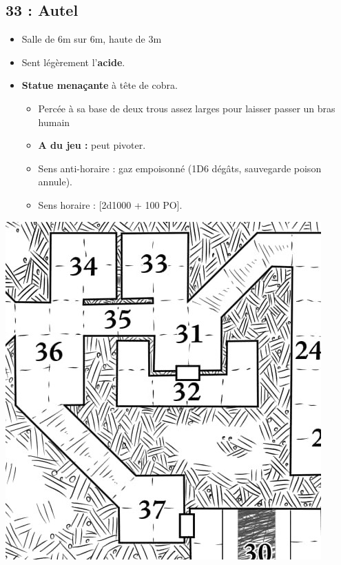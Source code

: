 \subsection{33 : Autel}\label{n3:s33}
\begin{itemize}
  \item Salle de 6m sur 6m, haute de 3m
  \item Sent légèrement l'\textbf{acide}.
  \item \textbf{Statue menaçante} à tête de cobra.
  \begin{itemize}
    \item Percée à sa base de deux trous assez larges pour laisser passer un bras humain
    \item \textbf{A du jeu :} peut pivoter.
    \item Sens anti-horaire : gaz empoisonné (1D6 dégâts, sauvegarde poison annule).
    \item Sens horaire : [2d1000 + 100 PO].
  \end{itemize}
\end{itemize}

\vfill
\pagebreak

\includegraphics[width=\columnwidth]{pics/map_31-37.jpg}
